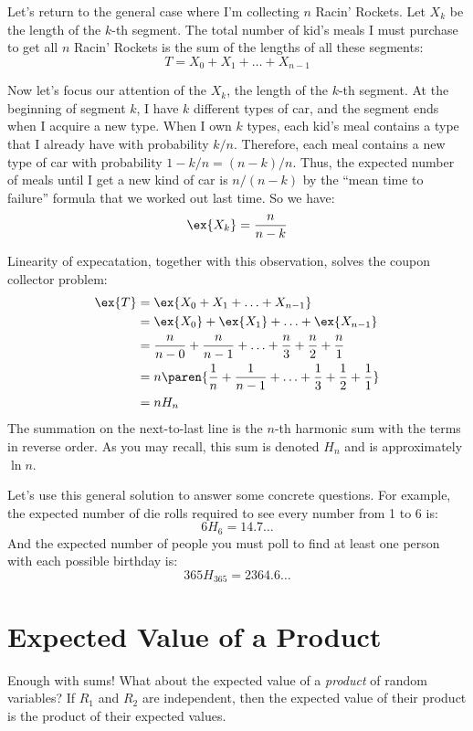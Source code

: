 \documentclass[12pt,twoside]{article}
\begin{document}
Let's return to the general case where I'm collecting $n$ Racin'
Rockets.  Let $X_k$ be the length of the $k$-th segment.  The total
number of kid's meals I must purchase to get all $n$ Racin' Rockets is
the sum of the lengths of all these segments:
%
\[
T = X_0 + X_1 + \ldots + X_{n-1}
\]

Now let's focus our attention of the $X_k$, the length of the $k$-th
segment.  At the beginning of segment $k$, I have $k$ different types
of car, and the segment ends when I acquire a new type.  When I own
$k$ types, each kid's meal contains a type that I already have with
probability $k / n$.  Therefore, each meal contains a new type of car
with probability $1 - k / n = (n - k) / n$.  Thus, the expected number
of meals until I get a new kind of car is $n / (n - k)$ by the ``mean
time to failure'' formula that we worked out last time.  So we have:
%
\[
\ex{X_k} = \frac{n}{n - k}
\]

Linearity of expecatation, together with this observation, solves the
coupon collector problem:
%
\begin{align*}
\ex{T}
  & = \ex{X_0 + X_1 + \ldots + X_{n-1}} \\
  & = \ex{X_0} + \ex{X_1} + \ldots + \ex{X_{n-1}} \\
  & = \frac{n}{n - 0} + \frac{n}{n - 1} + \ldots + \frac{n}{3} + \frac{n}{2} + \frac{n}{1} \\
  & = n \paren{\frac{1}{n} + \frac{1}{n-1} + \ldots + \frac{1}{3} + \frac{1}{2} + \frac{1}{1}} \\
  & = n H_n
\end{align*}
%
The summation on the next-to-last line is the $n$-th harmonic sum with
the terms in reverse order.  As you may recall, this sum is denoted
$H_n$ and is approximately $\ln n$.

Let's use this general solution to answer some concrete questions.
For example, the expected number of die rolls required to see every
number from 1 to 6 is:
%
\[
6 H_6 = 14.7 \ldots
\]
%
And the expected number of people you must poll to find at least one
person with each possible birthday is:
%
\[
365 H_{365} = 2364.6\ldots
\]

\section{Expected Value of a Product}

Enough with sums!  What about the expected value of a \textit{product}
of random variables?  If $R_1$ and $R_2$ are independent, then the
expected value of their product is the product of their expected
values.
\end{document}
